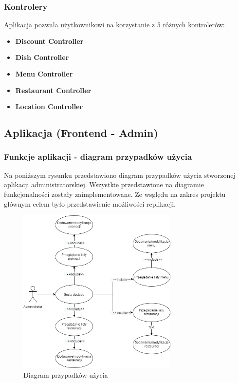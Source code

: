 \documentclass{article}
\begin{document}
		\subsubsection{Kontrolery}
		Aplikacja pozwala użytkownikowi na korzystanie z 5 różnych kontrolerów:
			\begin{itemize}
				\item
					\textbf{Discount Controller} 
				\item
					\textbf{Dish Controller}
				\item
					\textbf{Menu Controller}
				\item
					\textbf{Restaurant Controller}
				\item
					\textbf{Location Controller}
			\end{itemize}
		
	\newpage
	\subsection{Aplikacja (Frontend - Admin)}
		\subsubsection{Funkcje aplikacji - diagram przypadków użycia}
		Na poniższym rysunku przedstawiono diagram przypadków użycia stworzonej aplikacji administratorskiej. Wszystkie przedstawione na diagramie funkcjonalności zostały zaimplementowane. Ze wsględu na zakres projektu głównym celem było przedstawienie możliwości replikacji.
			\begin{figure}[hbt!]
				\includegraphics[width=8cm]{Files/Pictures/UMLAdminApp}
				\centering
				\caption{Diagram przypadków użycia}
			\end{figure}
\end{document}
